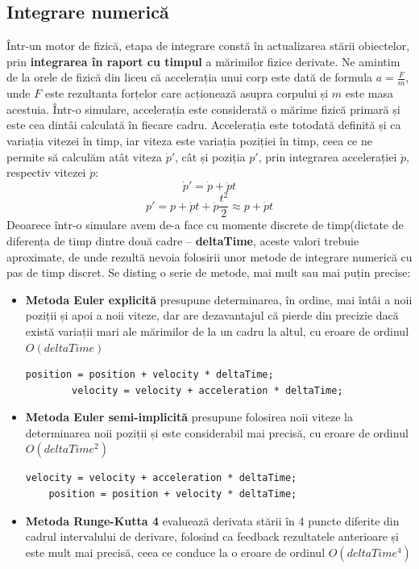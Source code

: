 \documentclass[12pt,a4paper]{report}
\begin{document}
\subsection{Integrare numerică}
Într-un motor de fizică, etapa de integrare constă în actualizarea stării obiectelor, prin \textbf{integrarea în raport cu timpul} a mărimilor fizice derivate. Ne amintim de la orele de fizică din liceu că accelerația unui corp este dată de formula $ a = \frac{F}{m} $, unde $F$ este rezultanta forțelor care acționează asupra corpului și $m$ este masa acestuia. Într-o simulare, accelerația este considerată o mărime fizică primară și este cea dintâi calculată în fiecare cadru. Accelerația este totodată definită și ca variația vitezei în timp, iar viteza este variația poziției în timp, ceea ce ne permite să calculăm atât viteza $\dot{p}'$, cât și poziția $p'$, prin integrarea accelerației $\ddot{p}$, respectiv vitezei $\dot{p}$:
$$ \dot{p}' = \dot{p} + \ddot{p}t $$
$$ p' = p + \dot{p}t + \ddot{p}\frac{t^2}{2} \approx p + \dot{p}t $$
Deoarece într-o simulare avem de-a face cu momente discrete de timp(dictate de diferența de timp dintre două cadre -- \textbf{deltaTime}, aceste valori trebuie aproximate, de unde rezultă nevoia folosirii unor metode de integrare numerică cu pas de timp discret.
Se disting o serie de metode, mai mult sau mai puțin precise\cite{integration_gaffer}:
\begin{itemize}
	\item \textbf{Metoda Euler explicită} presupune determinarea, în ordine, mai întâi a noii poziții și apoi a noii viteze, dar are dezavantajul că pierde din precizie dacă există variații mari ale mărimilor de la un cadru la altul, cu eroare de ordinul $O(deltaTime)$
	\begin{lstlisting}[style=myC++]
		position = position + velocity * deltaTime;
		velocity = velocity + acceleration * deltaTime;
	\end{lstlisting}
	\item \textbf{Metoda Euler semi-implicită} presupune folosirea noii viteze la determinarea noii poziții și este considerabil mai precisă, cu eroare de ordinul $O(deltaTime^2)$
	\begin{lstlisting}[style=myC++]
	velocity = velocity + acceleration * deltaTime;
	position = position + velocity * deltaTime;
	\end{lstlisting}
	\item \textbf{Metoda Runge-Kutta 4} evaluează derivata stării în 4 puncte diferite din cadrul intervalului de derivare, folosind ca feedback rezultatele anterioare și este mult mai precisă, ceea ce conduce la o eroare de ordinul $O(deltaTime^4)$
\end{itemize}
\end{document}

